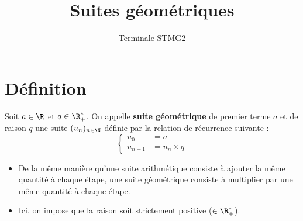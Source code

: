 \documentclass{article}
\title{Suites géométriques}
\date{}
\author{Terminale STMG2}
\begin{document}
\maketitle

\section{Définition}
\begin{tcolorbox}
\begin{definition}
Soit $a \in \R$ et $q \in \R_+^*$. On appelle \textbf{suite géométrique} de premier terme $a$ et de raison $q$ une suite $(u_n)_{n \in \N}$ définie par la relation de récurrence suivante :
\begin{equation*}
\begin{cases}
u_0 &= a\\
u_{n+1} &= u_n \times q
\end{cases}
\end{equation*}
\end{definition}
\end{tcolorbox}
\begin{remark}
\hfill
\begin{itemize}
\item De la même manière qu'une suite arithmétique consiste à ajouter la même quantité à chaque étape, une suite géométrique consiste à multiplier par une même quantité à chaque étape.
\item Ici, on impose que la raison soit strictement positive ($\in \R_+^*$).
\end{itemize}
\end{remark}
\end{document}
